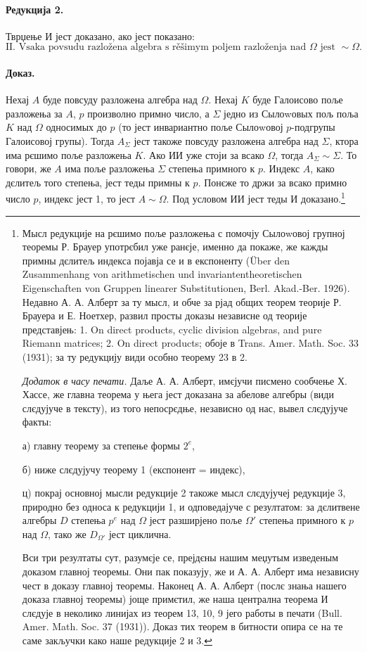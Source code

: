 \documentclass[11pt]{article}
\newcommand{\foreign}[1]{#1}
\begin{document}
\paragraph{Редукција 2.}
Тврџење И јест доказано, ако јест показано:
\[
\text{II. Vsaka povsudu razložena algebra s rěšimym poljem razloženja nad }\Omega\text{ jest }\sim\Omega .
\]

\paragraph{Доказ.}
Нехај \(A\) буде повсуду разложена алгебра над \(\Omega\). Нехај \(K\) буде Галоисово поље разложења за \(A\), \(p\) произволно примно число, а \(\Sigma\) једно из Сылоwовых пољ поља \(K\) над \(\Omega\) односимых до \(p\) (то јест инвариантно поље Сылоwовој \(p\)-подгрупы Галоисовој групы). Тогда \(A_{\Sigma}\) јест такоже повсуду разложена алгебра над \(\Sigma\), ктора има рєшимо поље разложења \(K\). Ако ИИ уже стоји за всако \(\Omega\), тогда \(A_{\Sigma}\sim \Sigma\). То говори, же \(A\) има поље разложења \(\Sigma\) степења примного к \(p\). Индекс \(A\), како дєлитељ того степења, јест теды примны к \(p\). Понєже то држи за всако примно число \(p\), индекс јест 1, то јест \(A\sim\Omega\). Под условом ИИ јест теды И доказано.\footnote{Мысл редукције на рєшимо поље разложења с помочју Сылоwовој групној теоремы Р. Брауер употрєбил уже ранєје, именно да покаже, же кажды примны дєлитељ индекса појавја се и в експоненту (\foreign{Über den Zusammenhang von arithmetischen und invariantentheoretischen Eigenschaften von Gruppen linearer Substitutionen, Berl. Akad.-Ber. 1926}). Недавно А. А. Алберт за ту мысл, и обче за рјад общих теорем теорије Р. Брауера и Е. Ноетхер, развил просты доказы независне од теорије представјењ: \foreign{1. On direct products, cyclic division algebras, and pure Riemann matrices; 2. On direct products;} обоје в \foreign{Trans. Amer. Math. Soc. 33 (1931)}; за ту редукцију види особно теорему 23 в 2.

\emph{Додаток в часу печати.} Даље А. А. Алберт, имєјучи писмено сообчење Х. Хассе, же главна теорема у њега јест доказана за абелове алгебры (види слєдујуче в тексту), из того непосрєдње, независно од нас, вывел слєдујуче факты:

а) главну теорему за степење формы \(2^e\),

б) ниже слєдујучу теорему 1 (експонент = индекс),

ц) покрај основној мысли редукције 2 такоже мысл слєдујучеј редукције 3, природно без односа к редукцији 1, и одповедајуче с резултатом: за дєлитвене алгебры \(D\) степења \(p^e\) над \(\Omega\) јест разширјено поље \(\Omega'\) степења примного к \(p\) над \(\Omega\), тако же \(D_{\Omega'}\) јест циклична.

Вси три резултаты сут, разумєје се, прејдєны нашим меџутым изведеным доказом главној теоремы. Они пак показују, же и А. А. Алберт има независну чест в доказу главној теоремы. Наконец А. А. Алберт (послє знања нашего доказа главној теоремы) јоще примєтил, же наша централна теорема И слєдује в неколико линијах из теорем 13, 10, 9 јего работы в печати (\foreign{Bull. Amer. Math. Soc. 37 (1931)}). Доказ тих теорем в битности опира се на те саме закључки како наше редукције 2 и 3.}
\end{document}

